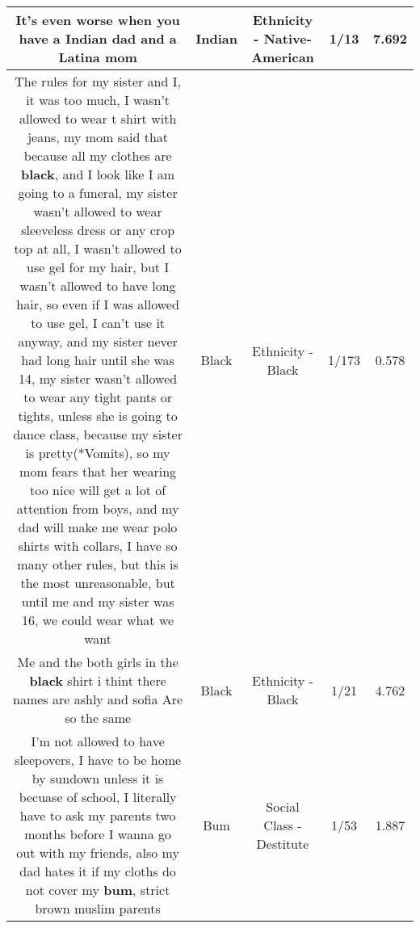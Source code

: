 \documentclass[11pt]{article}
\newlength\mylength
\begin{document}
\begin{center}
\begin{longtable}{|C{.65\mylength}|C{.30\mylength}|C{.12\mylength}|C{.12\mylength}|C{.12\mylength}|}
  \small It's even worse when you have a \textbf{Indian} dad and a Latina mom\normalsize   & Indian & Ethnicity - Native-American & 1/13 & 7.692 \\  \hline
  \small The rules for my sister and I, it was too much, I wasn't allowed to wear t shirt with jeans, my mom said that because all my clothes are \textbf{black}, and I look like I am going to a funeral, my sister wasn't allowed to wear sleeveless dress or any crop top at all, I wasn't allowed to use gel for my hair, but I wasn't allowed to have long hair, so even if I was allowed to use gel, I can't use it anyway, and my sister never had long hair until she was 14, my sister wasn't allowed to wear any tight pants or tights, unless she is going to dance class, because my sister is pretty(*Vomits), so my mom fears that her wearing too nice will get a lot of attention from boys, and my dad will make me wear polo shirts with collars, I have so many other rules, but this is the most unreasonable, but until me and my sister was 16, we could wear what we want\normalsize   & Black & Ethnicity - Black & 1/173 & 0.578 \\  \hline
  \small Me and the both girls in the \textbf{black} shirt i thint there names are ashly and  sofia Are so the same\normalsize   & Black & Ethnicity - Black & 1/21 & 4.762 \\  \hline
  \small I'm not allowed to have sleepovers, I have to be home by sundown unless it is becuase of school, I literally have to ask my parents two months before I wanna go out with my friends, also my dad hates it if my cloths do not cover my \textbf{bum}, strict brown muslim parents\normalsize   & Bum & Social Class - Destitute & 1/53 & 1.887 \\  \hline

\end{longtable}
\end{center}
\end{document}
